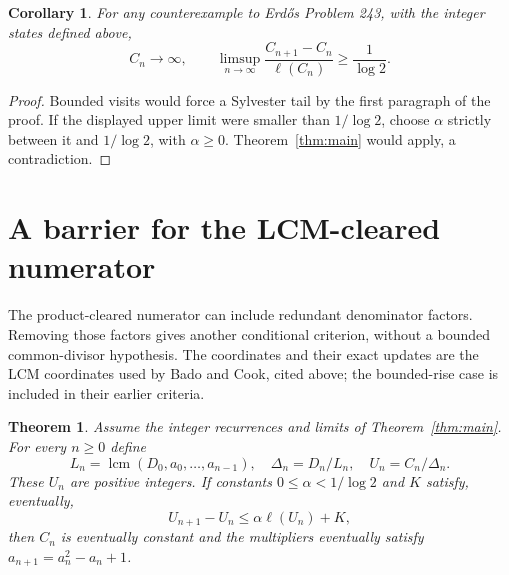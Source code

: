 \documentclass[11pt]{article}
\newtheorem{theorem}{Theorem}
\newtheorem{corollary}{Corollary}
\newcommand{\ellog}{\ell}
\begin{document}
\begin{corollary}\label{cor:necessary}
For any counterexample to Erd\H{o}s Problem 243, with the integer states
defined above,
\[
 C_n\to\infty,\qquad
 \limsup_{n\to\infty}
 \frac{C_{n+1}-C_n}{\ellog(C_n)}\ge\frac1{\log2}.
\]
\end{corollary}
\begin{proof}
Bounded visits would force a Sylvester tail by the first paragraph of the
proof. If the displayed upper limit were smaller than $1/\log2$, choose
$\alpha$ strictly between it and $1/\log2$, with $\alpha\ge0$.
Theorem~\ref{thm:main} would apply, a contradiction.
\end{proof}

\section{A barrier for the LCM-cleared numerator}
The product-cleared numerator can include redundant denominator factors.
Removing those factors gives another conditional criterion, without a
bounded common-divisor hypothesis. The coordinates and their exact updates
are the LCM coordinates used by Bado and Cook, cited above; the bounded-rise
case is included in their earlier criteria.

\begin{theorem}\label{thm:lcmbarrier}
Assume the integer recurrences and limits of Theorem~\ref{thm:main}.
For every $n\ge0$ define
\[
 L_n=\operatorname{lcm}(D_0,a_0,\ldots,a_{n-1}),\quad
 \Delta_n=D_n/L_n,\quad U_n=C_n/\Delta_n.
\]
These $U_n$ are positive integers. If constants
$0\le\alpha<1/\log2$ and $K$ satisfy, eventually,
\[
 U_{n+1}-U_n\le\alpha\ellog(U_n)+K,
\]
then $C_n$ is eventually constant and the multipliers eventually satisfy
$a_{n+1}=a_n^2-a_n+1$.
\end{theorem}
\end{document}
